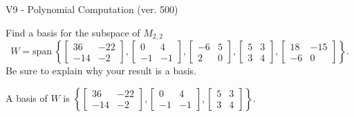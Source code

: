 \begin{exercise}
  \begin{exerciseTitle}V9 - Polynomial Computation (ver. 500)\end{exerciseTitle}
  \begin{exerciseStatement}
    Find a basis for the subspace of \(M_{2,2}\) 
\[W=\mathrm{span}\ \left\{\left[\begin{array}{cc}
36 & -22 \\
-14 & -2
\end{array}\right] , \left[\begin{array}{cc}
0 & 4 \\
-1 & -1
\end{array}\right] , \left[\begin{array}{cc}
-6 & 5 \\
2 & 0
\end{array}\right] , \left[\begin{array}{cc}
5 & 3 \\
3 & 4
\end{array}\right] , \left[\begin{array}{cc}
18 & -15 \\
-6 & 0
\end{array}\right]\right\}.\]
 Be sure to explain why your result is a basis.


  \end{exerciseStatement}
  \begin{exerciseAnswer}
   A basis of \(W\) is  \(\left\{\left[\begin{array}{cc}
36 & -22 \\
-14 & -2
\end{array}\right] , \left[\begin{array}{cc}
0 & 4 \\
-1 & -1
\end{array}\right] , \left[\begin{array}{cc}
5 & 3 \\
3 & 4
\end{array}\right]\right\}\).
  


  \end{exerciseAnswer}
\end{exercise}